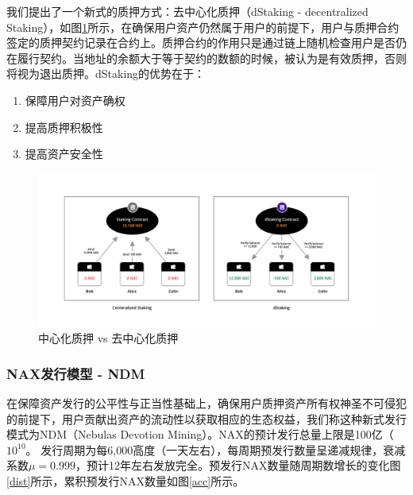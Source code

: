 我们提出了一个新式的质押方式：去中心化质押（dStaking - decentralized Staking），如图\ref{fig:dStaking}所示，在确保用户资产仍然属于用户的前提下，用户与质押合约签定的质押契约记录在合约上。质押合约的作用只是通过链上随机检查用户是否仍在履行契约。当地址的余额大于等于契约的数额的时候，被认为是有效质押，否则将视为退出质押。dStaking的优势在于：
\begin{enumerate}[\hspace{2cm}(a)]
    \item 保障用户对资产确权
    \item 提高质押积极性
    \item 提高资产安全性
\end{enumerate}

\begin{figure}[htbp]
  \centering
  \includegraphics[width=1\textwidth]{../common/dStaking.pdf}
  \caption{中心化质押 vs 去中心化质押\label{fig:dStaking}}
\end{figure}

\subsubsection{NAX发行模型 - NDM}
在保障资产发行的公平性与正当性基础上，确保用户质押资产所有权神圣不可侵犯的前提下，用户贡献出资产的流动性以获取相应的生态权益，我们称这种新式发行模式为NDM（Nebulas Devotion Mining）。NAX的预计发行总量上限是100亿（\(10^{10}\)。 发行周期为每6,000高度（一天左右），每周期预发行数量呈递减规律，衰减系数$\mu=0.999$，预计12年左右发放完全。预发行NAX数量随周期数增长的变化图\ref{dist}所示，累积预发行NAX数量如图\ref{acc}所示。

